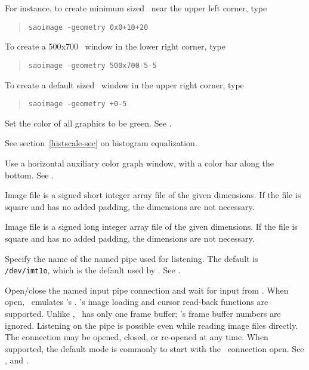 \begin{description}
For instance,
to create minimum sized \SAO\ near the upper left corner, type
\begin{quote}
\verb"saoimage -geometry 0x0+10+20"
\end{quote}
To create a 500x700 \SAO\ window in the lower right corner, type
\begin{quote}
\verb"saoimage -geometry 500x700-5-5"
\end{quote}
To create a default sized \SAO\ window in the upper right corner, type
\begin{quote}
\verb"saoimage -geometry +0-5"
\end{quote}


Set the color of all graphics to be green.  See .


See section~\ref{histscale-sec} on histogram equalization.


Use a horizontal auxiliary color graph window, with a color
bar along the bottom.  See .


Image file is a signed short integer array file of the given
dimensions.  If the file is square and has no added padding, the
dimensions are not necessary.


Image file is a signed long integer array file of the given
dimensions.  If the file is square and has no added padding, the
dimensions are not necessary.


Specify the name of the named pipe used for listening.  The
default is \verb"/dev/imt1o", which is the default used by \IRAF.
See .


Open/close the named input pipe connection and wait for input from \IRAF.
When open, \SAO\ emulates \IRAF's .
\IRAF's image loading and cursor read-back functions are supported.
Unlike , \SAO\ has only one frame buffer; \IRAF's
frame buffer numbers are ignored.  Listening on the pipe is possible
even while reading image files directly.  The connection may be opened,
closed, or re-opened at any time.  When supported, the default mode is
commonly to start with the \IRAF\ connection open.  See ,
 and .


\end{description}
